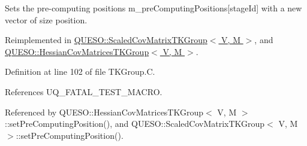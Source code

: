 Sets the pre-\/computing positions {\ttfamily m\-\_\-pre\-Computing\-Positions}\mbox{[}stage\-Id\mbox{]} with a new vector of size {\ttfamily position}. 



Reimplemented in \hyperlink{class_q_u_e_s_o_1_1_scaled_cov_matrix_t_k_group_a4e6325c0cd92d555f32aef52ae4755e3}{Q\-U\-E\-S\-O\-::\-Scaled\-Cov\-Matrix\-T\-K\-Group$<$ V, M $>$}, and \hyperlink{class_q_u_e_s_o_1_1_hessian_cov_matrices_t_k_group_a935cca86e22544d5a478e05862a4a200}{Q\-U\-E\-S\-O\-::\-Hessian\-Cov\-Matrices\-T\-K\-Group$<$ V, M $>$}.



Definition at line 102 of file T\-K\-Group.\-C.



References U\-Q\-\_\-\-F\-A\-T\-A\-L\-\_\-\-T\-E\-S\-T\-\_\-\-M\-A\-C\-R\-O.



Referenced by Q\-U\-E\-S\-O\-::\-Hessian\-Cov\-Matrices\-T\-K\-Group$<$ V, M $>$\-::set\-Pre\-Computing\-Position(), and Q\-U\-E\-S\-O\-::\-Scaled\-Cov\-Matrix\-T\-K\-Group$<$ V, M $>$\-::set\-Pre\-Computing\-Position().


